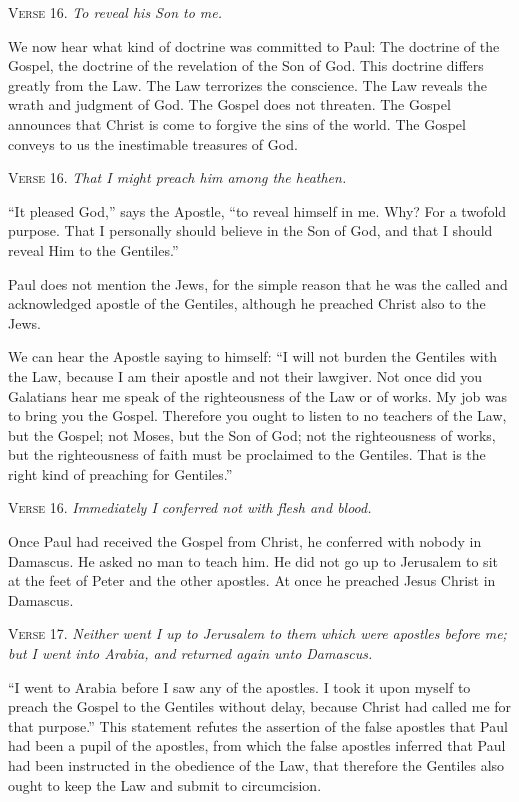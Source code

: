 \textsc{Verse} 16. \emph{To reveal his Son to me.}

We now hear what kind of doctrine was committed to Paul: The doctrine of the Gospel, the doctrine of the revelation of the Son of God. This doctrine differs greatly from the Law. The Law terrorizes the conscience. The Law reveals the wrath and judgment of God. The Gospel does not threaten. The Gospel announces that Christ is come to forgive the sins of the world. The Gospel conveys to us the inestimable treasures of God.

\textsc{Verse} 16. \emph{That I might preach him among the heathen.}

“It pleased God,” says the Apostle, “to reveal himself in me. Why? For a twofold purpose. That I personally should believe in the Son of God, and that I should reveal Him to the Gentiles.”

Paul does not mention the Jews, for the simple reason that he was the called and acknowledged apostle of the Gentiles, although he preached Christ also to the Jews.

We can hear the Apostle saying to himself: “I will not burden the Gentiles with the Law, because I am their apostle and not their lawgiver. Not once did you Galatians hear me speak of the righteousness of the Law or of works. My job was to bring you the Gospel. Therefore you ought to listen to no teachers of the Law, but the Gospel; not Moses, but the Son of God; not the righteousness of works, but the righteousness of faith must be proclaimed  to the Gentiles. That is the right kind of preaching for Gentiles.”

\textsc{Verse} 16. \emph{Immediately I conferred not with flesh and blood.}

Once Paul had received the Gospel from Christ, he conferred with nobody in Damascus. He asked no man to teach him. He did not go up to Jerusalem to sit at the feet of Peter and the other apostles. At once he preached Jesus Christ in Damascus.

\textsc{Verse} 17. \emph{Neither went I up to Jerusalem to them which were apostles before me; but I went into Arabia, and returned again unto Damascus.}

“I went to Arabia before I saw any of the apostles. I took it upon myself to preach the Gospel to the Gentiles without delay, because Christ had called me for that purpose.” This statement refutes the assertion of the false apostles that Paul had been a pupil of the apostles, from which the false apostles inferred that Paul had been instructed in the obedience of the Law, that therefore the Gentiles also ought to keep the Law and submit to circumcision.

